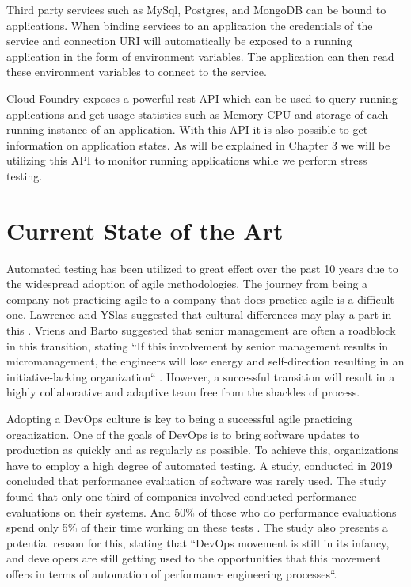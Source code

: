 Third party services such as MySql, Postgres, and MongoDB can be bound to applications. When binding services to an application the credentials of the service and connection URI will automatically be exposed to a running application in the form of environment variables. The application can then read these environment variables to connect to the service.

Cloud Foundry exposes a powerful rest API which can be used to query running applications and get usage statistics such as Memory CPU and storage of each running instance of an application. With this API it is also possible to get information on application states. As will be explained in Chapter 3 we will be utilizing this API to monitor running applications while we perform stress testing.

\section{Current State of the Art}

Automated testing has been utilized to great effect over the past 10 years due to the widespread adoption of agile methodologies. The journey from being a company not practicing agile to a company that does practice agile is a difficult one. Lawrence and YSlas suggested that cultural differences may play a part in this \cite{1667587}. Vriens and Barto suggested that senior management are often a roadblock in this transition, stating ``If this involvement by senior management results in micromanagement, the engineers will lose energy and self-direction resulting in an initiative-lacking organization`` \cite{4599511}. However, a successful transition will result in a highly collaborative and adaptive team free from the shackles of process.

Adopting a DevOps culture is key to being a successful agile practicing organization. One of the goals of DevOps is to bring software updates to production as quickly and as regularly as possible. To achieve this, organizations have to employ a high degree of automated testing. A study, conducted in 2019 concluded that performance evaluation of software was rarely used. The study found that only one-third of companies involved conducted performance evaluations on their systems. And 50\% of those who do performance evaluations spend only 5\% of their time working on these tests \cite{bezemer2019performance}. The study also presents a potential reason for this, stating that ``DevOps movement is
still in its infancy, and developers are still getting used to the opportunities that this movement offers in terms of automation of
performance engineering processes``.

